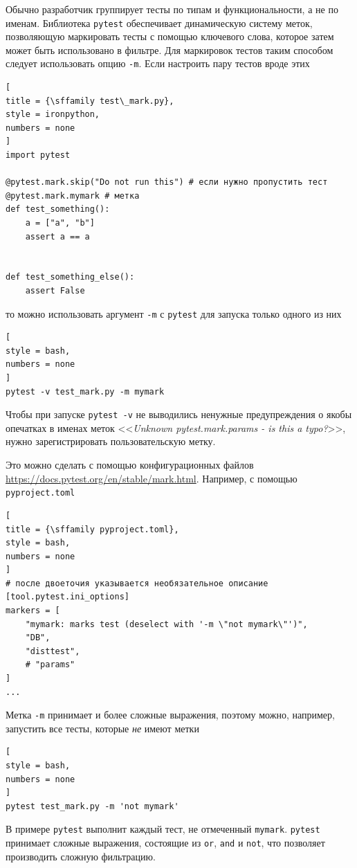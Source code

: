 \documentclass[%
	11pt,
	a4paper,
	utf8,
		]{article}
\begin{document}
Обычно разработчик группирует тесты по типам и функциональности, а не по именам. Библиотека \texttt{pytest} обеспечивает динамическую систему меток, позволяющую маркировать тесты с помощью ключевого слова, которое затем может быть использовано в фильтре. Для маркировок тестов таким способом следует использовать опцию \verb|-m|. Если настроить пару тестов вроде этих
\begin{lstlisting}[
title = {\sffamily test\_mark.py},
style = ironpython,
numbers = none	
]
import pytest

@pytest.mark.skip("Do not run this") # если нужно пропустить тест
@pytest.mark.mymark # метка
def test_something():
    a = ["a", "b"]
    assert a == a
    

def test_something_else():
    assert False
\end{lstlisting}
то можно использовать аргумент \verb|-m| с \texttt{pytest} для запуска только одного из них
\begin{lstlisting}[
style = bash,
numbers = none	
]
pytest -v test_mark.py -m mymark
\end{lstlisting}

Чтобы при запуске \texttt{pytest -v} не выводились ненужные предупреждения о якобы опечатках в именах меток <<\emph{Unknown pytest.mark.params - is this a typo?}>>, нужно зарегистрировать пользовательскую метку. 

Это можно сделать с помощью конфигурационных файлов \url{https://docs.pytest.org/en/stable/mark.html}. Например, с помощью \texttt{pyproject.toml}
\begin{lstlisting}[
title = {\sffamily pyproject.toml},
style = bash,
numbers = none	
]
# после двоеточия указывается необязательное описание
[tool.pytest.ini_options]
markers = [
    "mymark: marks test (deselect with '-m \"not mymark\"')",
    "DB",
    "disttest",
    # "params"
]
...
\end{lstlisting}

Метка \verb|-m| принимает и более сложные выражения, поэтому можно, например, запустить все тесты, которые \textit{не} имеют метки
\begin{lstlisting}[
style = bash,
numbers = none	
]
pytest test_mark.py -m 'not mymark'
\end{lstlisting}

В примере \texttt{pytest} выполнит каждый тест, не отмеченный \texttt{mymark}. \texttt{pytest} принимает сложные выражения, состоящие из \texttt{or}, \texttt{and} и \texttt{not}, что позволяет производить сложную фильтрацию.
\end{document}
